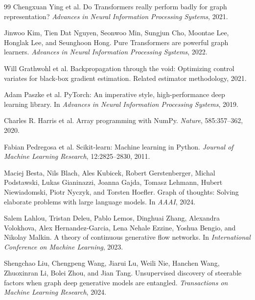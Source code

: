\documentclass[11pt]{article}
\begin{document}
\begin{thebibliography}{99}
Chengxuan Ying et al.
\newblock Do Transformers really perform badly for graph representation?
\newblock \emph{Advances in Neural Information Processing Systems}, 2021.

Jinwoo Kim, Tien Dat Nguyen, Seonwoo Min, Sungjun Cho, Moontae Lee, Honglak Lee, and Seunghoon Hong.
\newblock Pure Transformers are powerful graph learners.
\newblock \emph{Advances in Neural Information Processing Systems}, 2022.

Will Grathwohl et al.
\newblock Backpropagation through the void: Optimizing control variates for black-box gradient estimation.
\newblock Related estimator methodology, 2021.

Adam Paszke et al.
\newblock PyTorch: An imperative style, high-performance deep learning library.
\newblock In \emph{Advances in Neural Information Processing Systems}, 2019.

Charles R. Harris et al.
\newblock Array programming with NumPy.
\newblock \emph{Nature}, 585:357--362, 2020.

Fabian Pedregosa et al.
\newblock Scikit-learn: Machine learning in Python.
\newblock \emph{Journal of Machine Learning Research}, 12:2825--2830, 2011.


Maciej Besta, Nils Blach, Ales Kubicek, Robert Gerstenberger, Michal Podstawski, Lukas Gianinazzi, Joanna Gajda, Tomasz Lehmann, Hubert Niewiadomski, Piotr Nyczyk, and Torsten Hoefler.
\newblock Graph of thoughts: Solving elaborate problems with large language models.
\newblock In \emph{AAAI}, 2024.

Salem Lahlou, Tristan Deleu, Pablo Lemos, Dinghuai Zhang, Alexandra Volokhova, Alex Hernandez-Garcia, Lena Nehale Ezzine, Yoshua Bengio, and Nikolay Malkin.
\newblock A theory of continuous generative flow networks.
\newblock In \emph{International Conference on Machine Learning}, 2023.

Shengchao Liu, Chengpeng Wang, Jiarui Lu, Weili Nie, Hanchen Wang, Zhuoxinran Li, Bolei Zhou, and Jian Tang.
\newblock Unsupervised discovery of steerable factors when graph deep generative models are entangled.
\newblock \emph{Transactions on Machine Learning Research}, 2024.

\end{thebibliography}
\end{document}

